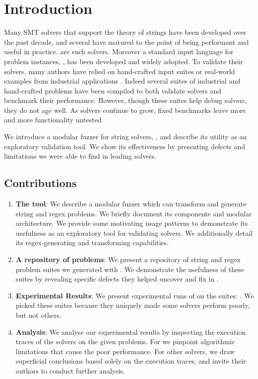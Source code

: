 \section{Introduction}

    Many SMT solvers that support the theory of strings have been developed over the past decade, and several have matured to the point of being performant and useful in practice. \theSolvers{}\cite{cvc4}\cite{z3str3}\cite{z3str2}\cite{norn} are \numSolvers{} such solvers. Moreover a standard input language for problem instances, \smtfull{}\cite{smt}, has been developed and widely adopted. To validate their solvers, many authors have relied on hand-crafted input suites or real-world examples from industrial applications \cite{cvc4-tests} \cite{z3str3-tests} \cite{z3str2-tests}. Indeed several suites of industrial and hand-crafted problems have been compiled \cite{kaluza} \cite{kausler} to both validate solvers and benchmark their performance. However, though these suites help debug solvers, they do not age well. As solvers continue to grow, fixed benchmarks leave more and more functionality untested.

    We introduce a modular fuzzer for string solvers, \fuzzer{}, and describe its utility as an exploratory validation tool. We show its effectiveness by presenting defects and limitations we were able to find in leading solvers.

    \subsection{Contributions}

        \begin{enumerate}
            \item \textbf{The \fuzzer{} tool}: We describe a modular fuzzer which can transform and generate \smtfull{} string and regex problems. We briefly document its components and modular architecture. We provide some motivating usage patterns to demonstrate its usefulness as an exploratory tool for validating solvers. We additionally detail its regex-generating and transforming capabilities.
            \item \textbf{A repository of \smtfull{} problems}: We present a repository of \smtfull{} string and regex problem suites we generated with \fuzzer{}. We demonstrate the usefulness of these suites by revealing specific defects they helped uncover and fix in \us{}.
            \item \textbf{Experimental Results}: We present experimental runs of \theSolvers{} on the \fuzzer{} suites: \theSuites{}. We picked these suites because they uniquely made some solvers perform poorly, but not others.
            \item \textbf{Analysis}: We analyse our experimental results by inspecting the execution traces of the solvers on the given problems. For \us{} we pinpoint algorithmic limitations that cause the poor performance. For other solvers, we draw superficial conclusions based solely on the execution traces, and invite their authors to conduct further analysis.
        \end{enumerate}
